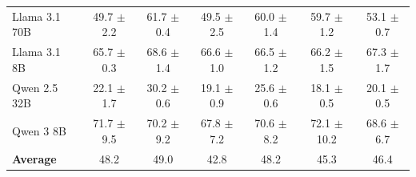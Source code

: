 \begin{table}[h]
\begin{tabular}{lcccccc}
Llama 3.1 70B & 49.7 $\pm$ 2.2 & 61.7 $\pm$ 0.4 & 49.5 $\pm$ 2.5 & 60.0 $\pm$ 1.4 & 59.7 $\pm$ 1.2 & 53.1 $\pm$ 0.7 \\
Llama 3.1 8B & 65.7 $\pm$ 0.3 & 68.6 $\pm$ 1.4 & 66.6 $\pm$ 1.0 & 66.5 $\pm$ 1.2 & 66.2 $\pm$ 1.5 & 67.3 $\pm$ 1.7 \\
Qwen 2.5 32B & 22.1 $\pm$ 1.7 & 30.2 $\pm$ 0.6 & 19.1 $\pm$ 0.9 & 25.6 $\pm$ 0.6 & 18.1 $\pm$ 0.5 & 20.1 $\pm$ 0.5 \\
Qwen 3 8B & 71.7 $\pm$ 9.5 & 70.2 $\pm$ 9.2 & 67.8 $\pm$ 7.2 & 70.6 $\pm$ 8.2 & 72.1 $\pm$ 10.2 & 68.6 $\pm$ 6.7 \\ \midrule
\textbf{Average} & 48.2 & 49.0 & 42.8 & 48.2 & 45.3 & 46.4 \\ \bottomrule
\end{tabular}
\end{table}
\begin{table}[tbh]
\centering
\caption{
    Domain-specific propensity scores under Harmful and Benign tool naming conditions. Propensity values are derived using the mean and standard deviation of results across three evaluation runs. All values are in percentages (\%). The  and  values in each column are highlighted.
}
\label{tab:domain-breakdown}
\end{table}
